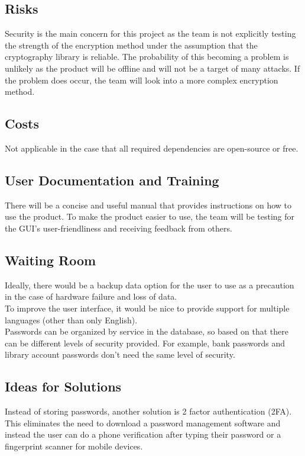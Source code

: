 \documentclass[12pt, titlepage]{article}
\begin{document}
\subsection{Risks}

Security is the main concern for this project as the team is not explicitly testing the strength of the encryption method under the assumption that the cryptography library is reliable. The probability of this becoming a problem is unlikely as the product will be offline and will not be a target of many attacks. If the problem does occur, the team will look into a more complex encryption method. 

\subsection{Costs}

Not applicable in the case that all required dependencies are open-source or free.

\subsection{User Documentation and Training}

There will be a concise and useful manual that provides instructions on how to use the product. To make the product easier to use, the team will be testing for the GUI’s user-friendliness and receiving feedback from others. 

\subsection{Waiting Room}

Ideally, there would be a backup data option for the user to use as a precaution in the case of hardware 
failure and loss of data.
\\
To improve the user interface, it would be nice to provide support for multiple languages (other than only English).
\\
Passwords can be organized by service in the database, so based on that there can be different levels of security provided. For example, bank passwords and library account passwords don’t need the same level of security.

\subsection{Ideas for Solutions}

Instead of storing passwords, another solution is 2 factor authentication (2FA). This eliminates the need to download a password management software and instead the user can do a phone verification after typing their password or a fingerprint scanner for mobile devices.
\end{document}
